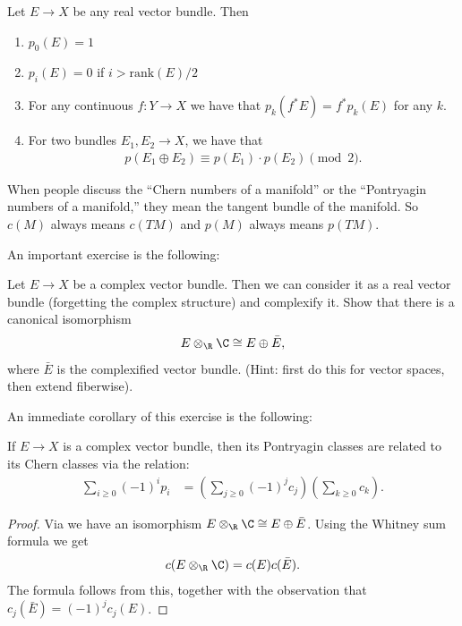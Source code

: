 \documentclass[11pt]{book}
\begin{document}
\begin{proposition} Let $E \to X$ be any real vector bundle. Then
\begin{enumerate}
    \item $p_0(E) = 1$
    \item $p_i(E) = 0$ if $i>\text{rank}(E)/2$
    \item For any continuous $f \colon Y \to X$ we have that $p_k(f^\ast E) = f^\ast p_k(E)$ for any $k$.
    \item For two bundles $E_1,E_2 \to X$, we have that
    \begin{align*}
        p(E_1 \oplus E_2) \equiv p(E_1)\cdot p(E_2) \pmod{2}.
    \end{align*}
\end{enumerate}
\end{proposition}

\begin{terminology} When people discuss the ``Chern numbers of a manifold'' or the ``Pontryagin numbers of a manifold,'' they mean the tangent bundle of the manifold. So $c(M)$ always means $c(TM)$ and $p(M)$ always means $p(TM)$.
\end{terminology}

An important exercise is the following:

\begin{exercise}\label{exer:complexified-complex-bundle} 
Let $E \to X$ be a complex vector bundle. Then we can consider it as a real vector bundle (forgetting the complex structure) and complexify it. Show that there is a canonical isomorphism
\begin{align*}
    E \otimes_\R \C \cong E \oplus \bar{E},
\end{align*}
where $\bar{E}$ is the complexified vector bundle. (Hint: first do this for vector spaces, then extend fiberwise).
\end{exercise}


An immediate corollary of this exercise is the following:
\begin{corollary}\label{cor:pontryagin-chern-formula} 
If $E \to X$ is a complex vector bundle, then its Pontryagin classes are related to its Chern classes via the relation:
\begin{align*}
    \sum_{i\ge0} (-1)^i p_i &= \left( \sum_{j\ge0} (-1)^j c_j \right)\left( \sum_{k\ge0} c_k \right).
\end{align*}
\end{corollary}
\begin{proof} Via  we have an isomorphism $E \otimes_\R \C \cong E \oplus \bar{E}$. Using the Whitney sum formula we get
\begin{align*}
    c(E \otimes_\R \C) = c(E) c(\bar{E}).
\end{align*}
The formula follows from this, together with the observation that $c_j(\bar{E}) = (-1)^j c_j(E)$.
\end{proof}
\end{document}
